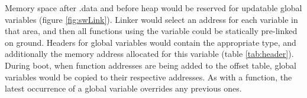 Memory space after .data and before heap would be reserved for updatable global variables  (figure \ref{fig:swLink}). Linker would select an address for each variable in that area, and then all functions using the variable could be statically pre-linked on ground. Headers for global variables would contain the appropriate type, and additionally the memory address allocated for this variable (table \ref{tab:header}). During boot, when function addresses are being added to the offset table, global variables would be copied to their respective addresses. As with a function, the latest occurrence of a global variable overrides any previous ones.
